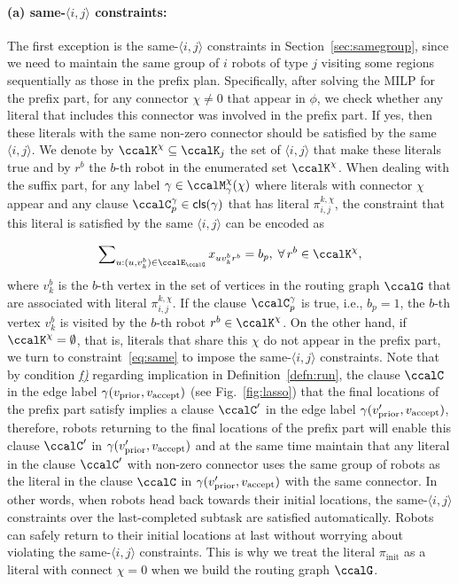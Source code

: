 \documentclass[Afour,sageh,times]{sagej}
\newcommand{\clause}[1]{\mathsf{cls}(#1)}
\newcommand{\vertex}[1]{v_{\textup{#1}}}
\newcommand{\ag}[2]{\langle#1,#2\rangle}
\renewcommand{\ap}[3]{\mathcal{\pi}_{{#1},{#2}}^{#3}}
\newcommand{\aap}[4]{\mathcal{\pi}_{{#1},{#2}}^{#3,#4}}
\begin{document}
{{{\paragraph{\quad (a) same-$\ag{i}{j}$ constraints:} The first exception is the same-$\ag{i}{j}$ constraints in Section~\ref{sec:samegroup}, since we need to maintain the same group of $i$ robots of type $j$ visiting some regions sequentially as those in the prefix plan. Specifically, after solving the MILP for the prefix part, for any connector $\chi\not=0$ that appear in $\phi$, we check whether any literal that includes this connector was involved in the prefix part. If yes, then these literals with the same non-zero connector should be satisfied by the same $\ag{i}{j}$. We denote by $\ccalK^\chi \subseteq \ccalK_j$ the set of $\ag{i}{j}$ that make these literals true and  by  $r^b$ the $b$-th robot in the enumerated set $\ccalK^\chi$. When dealing with the suffix part, for any label $\gamma \in\ccalM_\mathsf{\gamma}^\chi(\chi)$ where literals with connector $\chi$ appear and any clause $\ccalC_p^\gamma \in \clause{\gamma}$ that has  literal $\aap{i}{j}{k}{\chi}$, the constraint that this literal is satisfied by the same $\ag{i}{j}$  can be encoded as}
\begingroup\makeatletter{}\check@mathfonts
\def\maketag@@@#1{\hbox{\m@th\normalsize\normalfont#1}}%
\begin{align}\label{eq:same_suffix}
    \sum\nolimits_{u:(u, v_k^b) \in \ccalE_\ccalG} x_{u v_k^b r^b} =  b_p, \;\forall\, r^b \in \ccalK^\chi,
  \end{align}
\endgroup
where $v_k^b$ is the $b$-th vertex in the set of vertices in the routing graph $\ccalG$  that are associated with literal $\ap{i}{j}{k,\chi}$. If the clause $\ccalC_p^\gamma$ is true, i.e.,  $b_p=1$, the $b$-th vertex $v_k^b$ is visited by the $b$-th robot $r^b \in \ccalK^\chi$. On the other hand, if $\ccalK^\chi = \emptyset$, that is, literals that share this $\chi$ do not appear in the prefix part, we turn to constraint~\eqref{eq:same} to impose the same-$\ag{i}{j}$ constraints. Note that by condition \hyperref[cond:f]{\it f)} regarding implication in Definition~\ref{defn:run}, the clause $\ccalC$ in the edge label $\gamma(\vertex{prior}, \vertex{accept})$ (see Fig.~\ref{fig:lasso}) that the final locations of the prefix part satisfy implies a clause $\ccalC'$ in the edge label $\gamma(\vertex{prior}', \vertex{accept})$, therefore, robots returning to the final locations of the prefix part will enable this clause $\ccalC'$ in $\gamma(\vertex{prior}', \vertex{accept})$ and at the same time maintain that any literal in the clause $\ccalC'$ with non-zero connector uses the same group of robots as the literal in the clause $\ccalC$ in $\gamma(\vertex{prior}', \vertex{accept})$ with the same connector.  In other words, when robots head back towards their initial locations, the same-$\ag{i}{j}$ constraints over the last-completed subtask are satisfied automatically. Robots can safely return to their initial locations at last without worrying about violating the same-$\ag{i}{j}$ constraints. This is why we treat the literal $\pi_{\text{init}}$ as a literal with connect $\chi=0$ when we build the routing graph $\ccalG$.

}}
\end{document}
